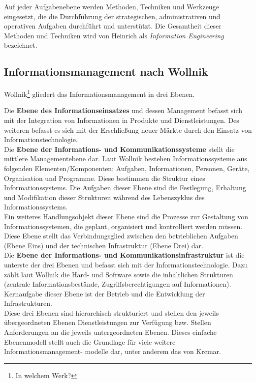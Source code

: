 Auf jeder Aufgabenebene werden Methoden, Techniken und Werkzeuge eingesetzt, die die Durchführung der strategischen, administrativen und operativen Aufgaben durchführt und unterstützt. Die Gesamtheit dieser Methoden und Techniken wird von Heinrich als \emph{Information Engineering} bezeichnet.

\subsection{Informationsmanagement nach Wollnik}
Wollnik\footnote{In welchem Werk?} gliedert das Informationsmanagement in drei Ebenen.

Die \textbf{Ebene des Informationseinsatzes} und dessen Management befasst sich mit der Integration von Informationen in Produkte und Dienstleistungen. Des weiteren befasst es sich mit der Erschließung neuer Märkte durch den Einsatz von Informationstechnologie.\\

Die \textbf{Ebene der Informations- und Kommunikationssysteme} stellt die mittlere Managementebene dar. Laut Wollnik bestehen Informationssysteme aus folgenden Elementen/Komponenten: Aufgaben, Informationen, Personen, Geräte, Organisation und Programme. Diese bestimmen die Struktur eines Informationssystems. Die Aufgaben dieser Ebene sind die Festlegung, Erhaltung und Modifikation dieser Strukturen während des Lebenszyklus des Informationssystems.\\

Ein weiteres Handlungsobjekt dieser Ebene sind die Prozesse zur Gestaltung von Informationssystemen, die geplant, organisiert und kontrolliert werden müssen. Diese Ebene stellt das Verbindungsglied zwischen den betrieblichen Aufgaben (Ebene Eins) und der technischen Infrastruktur (Ebene Drei) dar.\\

Die \textbf{Ebene der Informations- und Kommunikationsinfrastruktur} ist die unterste der drei Ebenen und befasst sich mit der Informationstechnologie. Dazu zählt laut Wollnik die Hard- und Software sowie die inhaltlichen Strukturen (zentrale Informationsbestände, Zugriffsberechtigungen auf Informationen). Kernaufgabe dieser Ebene ist der Betrieb und die Entwicklung der Infrastrukturen.\\

Diese drei Ebenen sind hierarchisch strukturiert und stellen den jeweils übergeordneten Ebenen Dienstleistungen zur Verfügung bzw. Stellen Anforderungen an die jeweils untergeordneten Ebenen. Dieses einfache Ebenenmodell stellt auch die Grundlage für viele weitere Informationsmanagement- modelle dar, unter anderem das von Krcmar.


